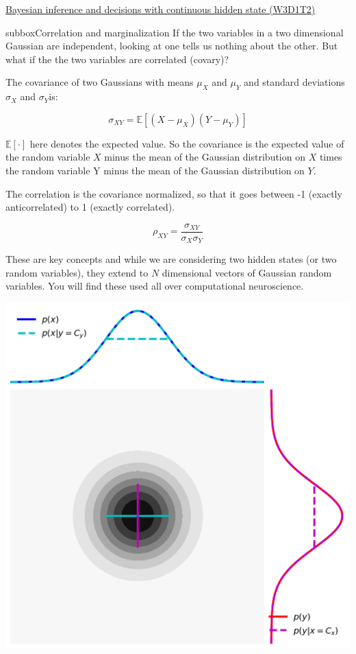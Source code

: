 \begin{textbox}{\href{https://compneuro.neuromatch.io/tutorials/W3D1_BayesianDecisions/student/W3D1_Tutorial2.html}{Bayesian inference and decisions with continuous hidden state (W3D1T2)} }
\begin{subbox}{subbox}{Correlation and marginalization}
If the two variables in a two dimensional Gaussian are independent, looking at one tells us nothing about the other. But what if the the two variables are correlated (covary)?

The covariance of two Gaussians with means $\mu_X$ and $\mu_Y$ and standard deviations $\sigma_X$ and $\sigma_Y$is:

\begin{equation}
\sigma_{XY} = \mathbb{E}[(X-\mu_{X})(Y-\mu_{Y})]
\end{equation}

$\mathbb{E}[\cdot]$ here denotes the expected value. So the covariance is the expected value of the random variable $X$ minus the mean of the Gaussian distribution on $X$ times the random variable Y minus the mean of the Gaussian distribution on $Y$.

The correlation is the covariance normalized, so that it goes between -1 (exactly anticorrelated) to 1 (exactly correlated).

\begin{equation}
\rho_{XY} = \frac{\sigma_{XY}}{\sigma_{X}\sigma_{Y}}
\end{equation}

These are key concepts and while we are considering two hidden states (or two random variables), they extend to $N$ dimensional vectors of Gaussian random variables. You will find these used all over computational neuroscience.
\begin{center}
    
\includegraphics[scale=0.18]{Figures/BD/BD_Figure10.png}
\end{center}

\end{subbox}
\end{textbox}
